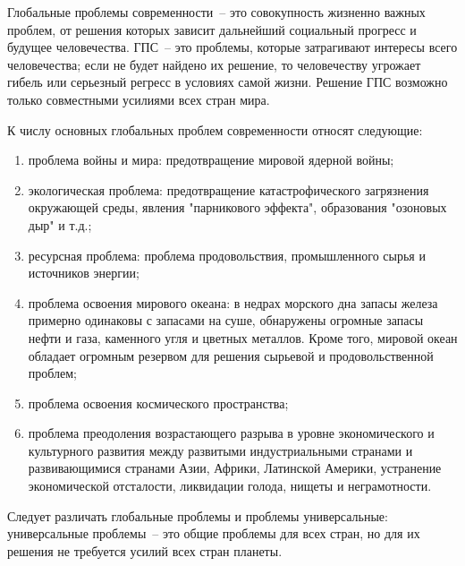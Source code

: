 Глобальные проблемы современности~-- это совокупность жизненно важных проблем, от решения
которых зависит дальнейший социальный прогресс и будущее человечества. ГПС~-- это
проблемы, которые затрагивают интересы всего человечества; если не будет найдено их
решение, то человечеству угрожает гибель или серьезный регресс в условиях самой жизни.
Решение ГПС возможно только совместными усилиями всех стран мира. 

К числу основных глобальных проблем современности относят следующие:
\begin{enumerate}
    \item проблема войны и мира: предотвращение мировой ядерной войны;
    \item экологическая проблема: предотвращение катастрофического загрязнения окружающей
        среды, явления "парникового эффекта", образования "озоновых дыр" и т.д.;
    \item ресурсная проблема: проблема продовольствия, промышленного сырья и источников
        энергии;
    \item проблема освоения мирового океана: в недрах морского дна запасы железа примерно
        одинаковы с запасами на суше, обнаружены огромные запасы нефти и газа, каменного
        угля и цветных металлов. Кроме того, мировой океан обладает огромным резервом для
        решения сырьевой и продовольственной проблем;
    \item проблема освоения космического пространства;
    \item проблема преодоления возрастающего разрыва в уровне экономического и культурного
        развития между развитыми индустриальными странами и развивающимися странами Азии,
        Африки, Латинской Америки, устранение экономической отсталости, ликвидации голода,
        нищеты и неграмотности. 
\end{enumerate}

Следует различать глобальные проблемы и проблемы универсальные: универсальные проблемы~--
это общие проблемы для всех стран, но для их решения не требуется усилий всех стран планеты.
